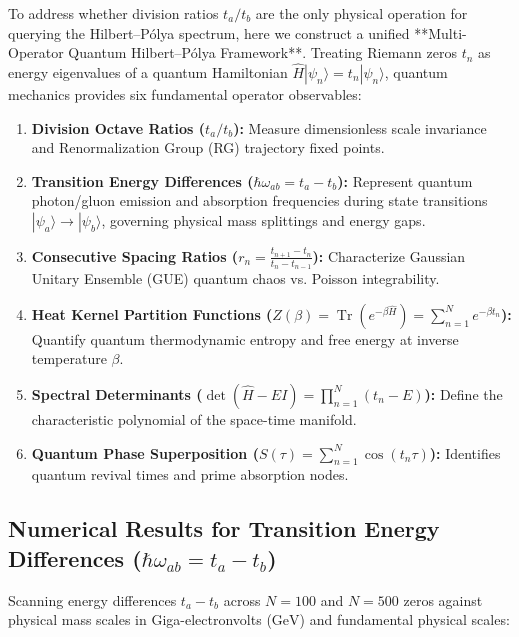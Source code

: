 \documentclass[11pt,a4paper]{article}
\begin{document}
To address whether division ratios $t_a / t_b$ are the only physical operation for querying the Hilbert--P\'olya spectrum, here we construct a unified **Multi-Operator Quantum Hilbert--P\'olya Framework**. Treating Riemann zeros $t_n$ as energy eigenvalues of a quantum Hamiltonian $\hat{H} |\psi_n\rangle = t_n |\psi_n\rangle$, quantum mechanics provides six fundamental operator observables:

\begin{enumerate}
    \item \textbf{Division Octave Ratios ($t_a / t_b$):} Measure dimensionless scale invariance and Renormalization Group (RG) trajectory fixed points.
    \item \textbf{Transition Energy Differences ($\hbar \omega_{ab} = t_a - t_b$):} Represent quantum photon/gluon emission and absorption frequencies during state transitions $|\psi_a\rangle \to |\psi_b\rangle$, governing physical mass splittings and energy gaps.
    \item \textbf{Consecutive Spacing Ratios ($r_n = \frac{t_{n+1} - t_n}{t_n - t_{n-1}}$):} Characterize Gaussian Unitary Ensemble (GUE) quantum chaos vs. Poisson integrability.
    \item \textbf{Heat Kernel Partition Functions ($Z(\beta) = \operatorname{Tr}(e^{-\beta \hat{H}}) = \sum_{n=1}^N e^{-\beta t_n}$):} Quantify quantum thermodynamic entropy and free energy at inverse temperature $\beta$.
    \item \textbf{Spectral Determinants ($\operatorname{det}(\hat{H} - E I) = \prod_{n=1}^N (t_n - E)$):} Define the characteristic polynomial of the space-time manifold.
    \item \textbf{Quantum Phase Superposition ($S(\tau) = \sum_{n=1}^N \cos(t_n \tau)$):} Identifies quantum revival times and prime absorption nodes.
\end{enumerate}

\subsection{Numerical Results for Transition Energy Differences (\texorpdfstring{$\hbar \omega_{ab} = t_a - t_b$}{hbar omega_{ab} = t_a - t_b})}
Scanning energy differences $t_a - t_b$ across $N=100$ and $N=500$ zeros against physical mass scales in Giga-electronvolts ($\text{GeV}$) and fundamental physical scales:
\end{document}
